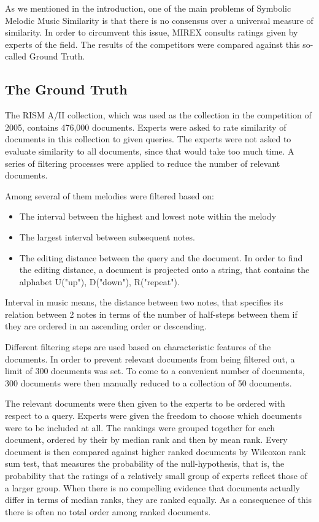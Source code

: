 \documentclass{llncs}
\begin{document}
\begin{itemize}
		As we mentioned in the introduction, one of the main problems of Symbolic Melodic Music Similarity is that there is no consensus over a universal measure of similarity. In order to circumvent this issue, MIREX consults ratings given by experts of the field. The results of the competitors were compared against this so-called Ground Truth.
		
		\subsection{The Ground Truth}
 		The RISM A/II collection, which was used as the collection in the competition of 2005, contains 476,000 documents. Experts were asked to rate similarity of documents in this collection to given queries. The experts were not asked to evaluate similarity to all documents, since that would take too much time. A series of filtering processes were applied to reduce the number of relevant documents. 

 		Among several of them melodies were filtered based on: 

 		\begin{itemize}
 			\item The interval between the highest and lowest note within the melody
 			\item The largest interval between subsequent notes.
 			\item The editing distance between the query and the document. In order to find the editing distance, a document is projected onto a string, that contains the alphabet U("up"), D("down"), R("repeat"). 
 		\end{itemize} 

        Interval in music means, the distance between two notes, that specifies its relation between 2 notes in terms of the number of half-steps between them if they are ordered in an ascending order or descending.
	    
 		Different filtering steps are used based on characteristic features of the documents. In order to prevent relevant documents from being filtered out, a limit of 300 documents was set. To come to a convenient number of documents, 300 documents were then manually reduced to a collection of 50 documents.

 		The relevant documents were then given to the experts to be ordered with respect to a query. Experts were given the freedom to choose which documents were to be included at all. The rankings were grouped together for each document, ordered by their by median rank and then by mean rank. Every document is then compared against higher ranked documents by Wilcoxon rank sum test, that measures the probability of the null-hypothesis, that is, the probability that the ratings of a relatively small group of experts reflect those of a larger group. When there is no compelling evidence that documents actually differ in terms of median ranks, they are ranked equally. As a consequence of this there is often no total order among ranked documents. 


\end{itemize}
\end{document}
